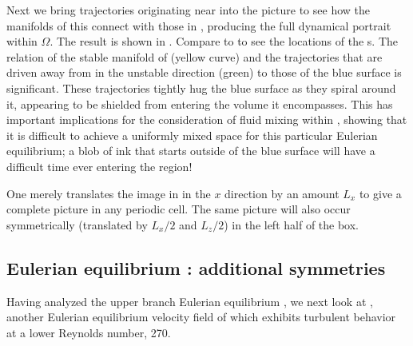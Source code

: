 \documentclass[lineno]{jfm}
\begin{document}
Next we bring trajectories originating near  into the picture to 
see how the manifolds of this {\stagp} connect with those in 
, producing the full dynamical portrait within 
$\Omega$.  The result is shown in . Compare to 
 to see the locations of the {\stagp}s. 
The relation of the stable manifold of  (yellow curve) and the 
trajectories that are driven away from  in the unstable direction 
(green) to those of the blue surface is significant. These 
trajectories tightly hug the blue surface as they spiral around it, 
appearing to be shielded from entering the volume it encompasses. This 
has important implications for the consideration of fluid mixing 
within {\pCf},  showing that it is difficult to achieve a 
uniformly mixed space for this particular Eulerian equilibrium; a blob of ink that 
starts outside of the blue surface will have a difficult time ever 
entering the region! 
 
One merely translates the image in  in the $x$ 
direction by an amount $L_{x}$ to give a complete picture in any periodic 
cell. The same picture will also occur symmetrically (translated by 
$L_{x}/2$ and $L_{z}/2$) in the left half of the box. 


\subsection{Eulerian equilibrium {\tEQeight}: additional symmetries}
\label{sect:EQ8}

Having analyzed the upper branch Eulerian equilibrium {\tEQtwo}, we next look at 
{\tEQeight}, another Eulerian equilibrium velocity field of {\pCf} which exhibits 
turbulent behavior at a lower Reynolds number, 270.
\end{document}
